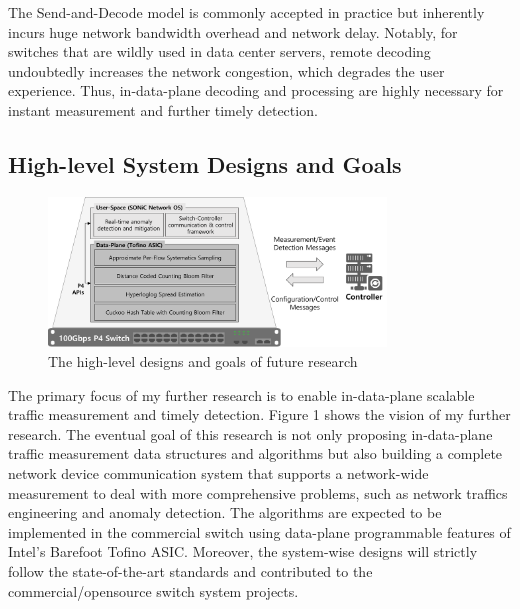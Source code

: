 \documentclass{NSF}
\begin{document}
The Send-and-Decode model is commonly accepted in practice but inherently incurs huge network bandwidth overhead and network delay. Notably, for switches that are wildly used in data center servers, remote decoding undoubtedly increases the network congestion, which degrades the user experience. Thus, in-data-plane decoding and processing are highly necessary for instant measurement and further timely detection.

\subsection{High-level System Designs and Goals}
\begin{figure}[b]
  \centering
  \includegraphics[width=0.8\textwidth]{fig/Vision.png} 
  \caption{The high-level designs and goals of future research}
\end{figure}

The primary focus of my further research is to enable in-data-plane scalable traffic measurement and timely detection. Figure 1 shows the vision of my further research. The eventual goal of this research is not only proposing in-data-plane traffic measurement data structures and algorithms but also building a complete network device communication system that supports a network-wide measurement to deal with more comprehensive problems, such as network traffics engineering and anomaly detection. The algorithms are expected to be implemented in the commercial switch using data-plane programmable features of Intel's Barefoot Tofino ASIC. Moreover, the system-wise designs will strictly follow the state-of-the-art standards and contributed to the commercial/opensource switch system projects. 
\end{document}
